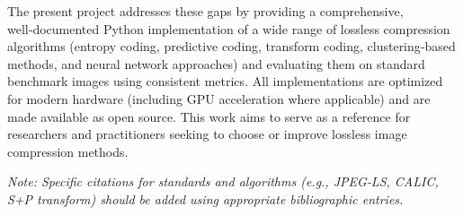 The present project addresses these gaps by providing a comprehensive, well‑documented Python implementation of a wide range of lossless compression algorithms (entropy coding, predictive coding, transform coding, clustering‑based methods, and neural network approaches) and evaluating them on standard benchmark images using consistent metrics. All implementations are optimized for modern hardware (including GPU acceleration where applicable) and are made available as open source. This work aims to serve as a reference for researchers and practitioners seeking to choose or improve lossless image compression methods.

\noindent\textit{Note: Specific citations for standards and algorithms (e.g., JPEG‑LS, CALIC, S+P transform) should be added using appropriate bibliographic entries.}